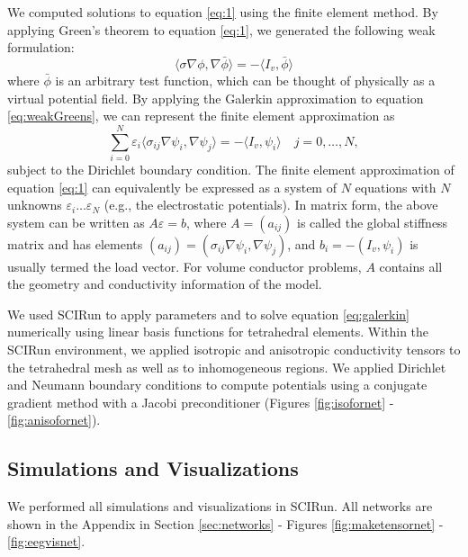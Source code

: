 We computed solutions to equation \ref{eq:1} using the finite element method. By applying Green's theorem to equation \ref{eq:1}, we generated the following weak formulation:
\begin{equation}
\label{eq:weakGreens}
\langle \sigma \nabla \phi, \nabla \bar{\phi} \rangle = -\langle I_v, \bar{\phi} \rangle
\end{equation}
where $ \bar{\phi}$ is an arbitrary test function, which can be thought of physically as a virtual potential field. By applying the Galerkin approximation to equation \ref{eq:weakGreens}, we can represent the finite element approximation as
\begin{equation}
\label{eq:galerkin}
\sum_{i = 0}^{N} \varepsilon_i \langle \sigma_{ij} \nabla \psi_{i}, \nabla \psi_{j} \rangle = -\langle I_v, \psi_i \rangle \quad j = 0, \dots, N,
\end{equation}
subject to the Dirichlet boundary condition. The finite element approximation of equation \ref{eq:1} can equivalently be expressed as a system of $N$ equations with $N$ unknowns $\varepsilon_i \dots \varepsilon_N$ (e.g., the electrostatic potentials). In matrix form, the above system can be written as $A \varepsilon = b$,  where $A=(a_{ij})$ is called the global stiffness matrix and has elements $(a_{ij}) = (\sigma_{ij} \nabla \psi_{i}, \nabla \psi_{j})$, and $b_i = -(I_v, \psi_i)$ is usually termed the load vector. For volume conductor problems, $A$ contains all the geometry and conductivity information of the model. \cite{SCI:Joh2015c}

We used SCIRun to apply parameters and to solve equation \ref{eq:galerkin} numerically using linear basis functions for tetrahedral elements. Within the SCIRun environment, we applied isotropic and anisotropic conductivity tensors to the tetrahedral mesh as well as to inhomogeneous regions. We applied Dirichlet and Neumann boundary conditions to compute potentials using a conjugate gradient method with a Jacobi preconditioner (Figures \ref{fig:isofornet} - \ref{fig:anisofornet}).

\subsection{Simulations and Visualizations}
\label{sec:sim}

We performed all simulations and visualizations in SCIRun. All networks are shown in the Appendix in Section \ref{sec:networks} - Figures \ref{fig:maketensornet} - \ref{fig:eegvisnet}.

